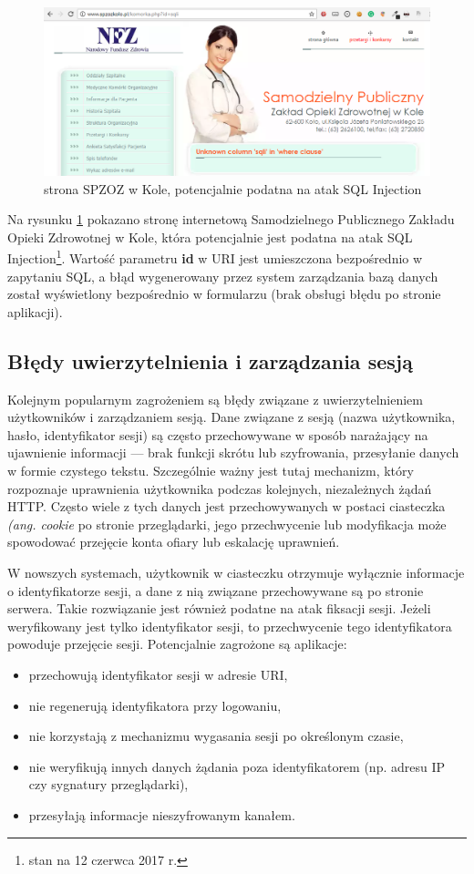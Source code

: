 \documentclass[11pt,a4paper,polish,thesis]{dcsbook}
\begin{document}
\begin{figure}[h]
\centering
\includegraphics[scale=0.4]{szpital}

\caption{strona SPZOZ w Kole, potencjalnie podatna na atak SQL Injection}
\label{fig:szpital}
\end{figure}

Na rysunku \ref{fig:szpital} pokazano stronę internetową Samodzielnego Publicznego Zakładu Opieki Zdrowotnej w Kole, która potencjalnie jest podatna na atak SQL Injection\footnote{stan na 12 czerwca 2017 r.}. Wartość parametru \textbf{id} w URI jest umieszczona bezpośrednio w zapytaniu SQL, a błąd wygenerowany przez system zarządzania bazą danych został wyświetlony bezpośrednio w formularzu (brak obsługi błędu po stronie aplikacji).

\subsection{Błędy uwierzytelnienia i zarządzania sesją}
Kolejnym popularnym zagrożeniem są błędy związane z uwierzytelnieniem użytkowników i zarządzaniem sesją. Dane związane z sesją (nazwa użytkownika, hasło, identyfikator sesji) są często przechowywane w sposób narażający na ujawnienie informacji --- brak funkcji skrótu lub szyfrowania, przesyłanie danych w formie czystego tekstu. Szczególnie ważny jest tutaj mechanizm, który rozpoznaje uprawnienia użytkownika podczas kolejnych, niezależnych żądań HTTP. Często wiele z tych danych jest przechowywanych w postaci ciasteczka \textit{(ang. cookie} po stronie przeglądarki, jego przechwycenie lub modyfikacja może spowodować przejęcie konta ofiary lub eskalację uprawnień.

W nowszych systemach, użytkownik w ciasteczku otrzymuje wyłącznie informacje o identyfikatorze sesji, a dane z nią związane przechowywane są po stronie serwera. Takie rozwiązanie jest również podatne na atak fiksacji sesji. Jeżeli weryfikowany jest tylko identyfikator sesji, to przechwycenie tego identyfikatora powoduje przejęcie sesji. Potencjalnie zagrożone są aplikacje:
\begin{itemize}
\item przechowują identyfikator sesji w adresie URI,
\item nie regenerują identyfikatora przy logowaniu,
\item nie korzystają z mechanizmu wygasania sesji po określonym czasie,
\item nie weryfikują innych danych żądania poza identyfikatorem (np. adresu IP czy sygnatury przeglądarki),
\item przesyłają informacje nieszyfrowanym kanałem.
\end{itemize}
\end{document}
